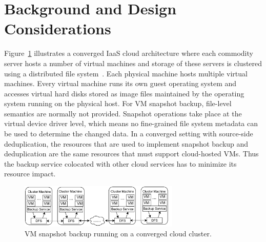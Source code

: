 \section{Background and Design Considerations}
\label{sect:background}

Figure~\ref{fig:collocated} illustrates a converged IaaS cloud architecture 
where
each commodity server hosts a number of virtual machines and storage of these servers
is clustered using a distributed file system~\cite{googlefs03,hdfs10}.
Each physical machine hosts multiple virtual machines.  Every virtual machine
runs its own guest operating system and accesses virtual hard disks 
stored as image files maintained by the operating system running on the
physical host.
For VM snapshot backup, file-level semantics are normally not provided.
Snapshot operations take place at the virtual device driver level, which
means no fine-grained file system metadata can be used to determine the changed data. 
In a converged setting with source-side deduplication, the resources that are used to implement snapshot
backup and deduplication are the same resources that must support cloud-hosted
VMs.  Thus the backup service colocated with 
other cloud services has to minimize its resource impact.  





\begin{figure}[htb]
    \centering
    \includegraphics[width=3in]{images/colocated-arch}
    \caption{VM snapshot backup running on a converged cloud cluster.}
    \label{fig:collocated}
\end{figure}

